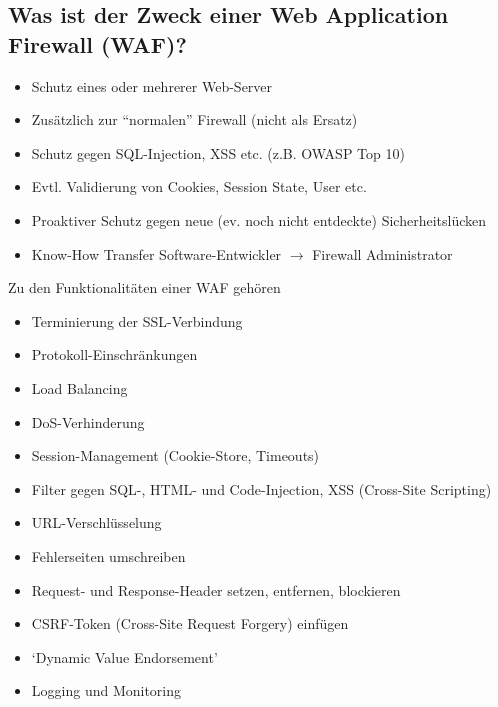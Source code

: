 \subsection*{Was ist der Zweck einer Web Application Firewall (WAF)?}
\begin{itemize}
    \item Schutz eines oder mehrerer Web-Server
    \item Zusätzlich zur "`normalen"' Firewall (nicht als Ersatz)
    \item Schutz gegen SQL-Injection, XSS etc. (z.B. OWASP Top 10)
    \item Evtl. Validierung von Cookies, Session State, User etc.
    \item Proaktiver Schutz gegen neue (ev. noch nicht entdeckte) Sicherheitslücken
    \item Know-How Transfer Software-Entwickler $\rightarrow$ Firewall Administrator
\end{itemize}

Zu den Funktionalitäten einer WAF gehören
\begin{itemize}
    \item Terminierung der SSL-Verbindung
    \item Protokoll-Einschränkungen
    \item Load Balancing
    \item DoS-Verhinderung
    \item Session-Management (Cookie-Store, Timeouts)
    \item Filter gegen SQL-, HTML- und Code-Injection, XSS (Cross-Site Scripting)
    \item URL-Verschlüsselung
    \item Fehlerseiten umschreiben
    \item Request- und Response-Header setzen, entfernen, blockieren
    \item CSRF-Token (Cross-Site Request Forgery) einfügen
    \item `Dynamic Value Endorsement'
    \item Logging und Monitoring
\end{itemize}
